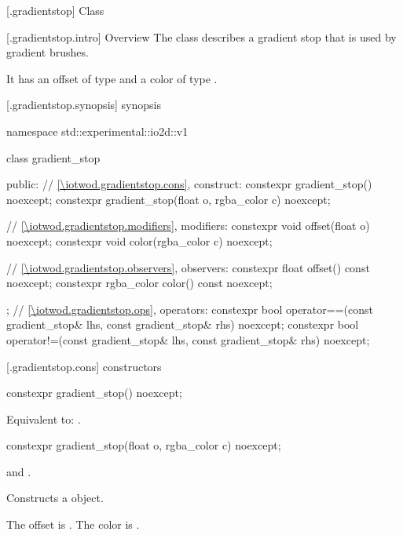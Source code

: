  [\iotwod.gradientstop] {Class }

 [\iotwod.gradientstop.intro] {Overview}
\pnum
{}%
The class  describes a gradient stop that is used by gradient brushes.

\pnum
It has an offset of type  and a color of type .

 [\iotwod.gradientstop.synopsis] { synopsis}

\begin{codeblock}
namespace std::experimental::io2d::v1 {
  class gradient_stop {
  public:
    // \ref{\iotwod.gradientstop.cons}, construct:
    constexpr gradient_stop() noexcept;
    constexpr gradient_stop(float o, rgba_color c) noexcept;
    
    // \ref{\iotwod.gradientstop.modifiers}, modifiers:
    constexpr void offset(float o) noexcept;
    constexpr void color(rgba_color c) noexcept;
	
    // \ref{\iotwod.gradientstop.observers}, observers:
    constexpr float offset() const noexcept;
    constexpr rgba_color color() const noexcept;
  };
  // \ref{\iotwod.gradientstop.ops}, operators:
  constexpr bool operator==(const gradient_stop& lhs, const gradient_stop& rhs)
    noexcept;
  constexpr bool operator!=(const gradient_stop& lhs, const gradient_stop& rhs)
    noexcept;
}
\end{codeblock}

 [\iotwod.gradientstop.cons] { constructors}

%
\begin{itemdecl}
constexpr gradient_stop() noexcept;
\end{itemdecl}
\begin{itemdescr}
\pnum
\effects
Equivalent to: .
\end{itemdescr}

%
\begin{itemdecl}
constexpr gradient_stop(float o, rgba_color c) noexcept;
\end{itemdecl}
\begin{itemdescr}
\pnum
\requires
{} and .

\pnum
\effects
Constructs a  object.

\pnum
The offset is . The color is .
\end{itemdescr}

